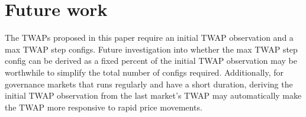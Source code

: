 \documentclass{article}
\begin{document}
\section{Future work}
The TWAPs proposed in this paper require an initial TWAP observation and a max TWAP step configs. Future investigation into whether the max TWAP step config can be derived as a fixed percent of the initial TWAP observation may be worthwhile to simplify the total number of configs required. Additionally, for governance markets that runs  regularly and have a short duration, deriving the initial TWAP observation from the last market's TWAP may automatically make the TWAP more responsive to rapid price movements.

\nocite{*}                %
\end{document}
